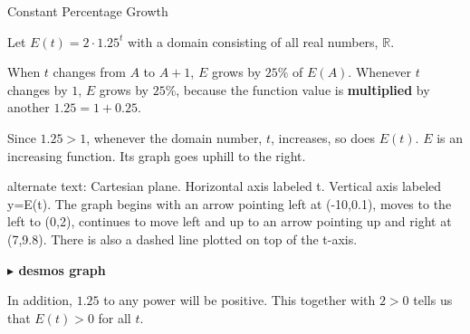 \documentclass{ximera}
\begin{document}
\begin{example} Constant Percentage Growth

Let $E(t) = 2 \cdot 1.25^t$ with a domain consisting of all real numbers, $\mathbb{R}$. 

When $t$ changes from $A$ to $A+1$, $E$ grows by $25\%$ of $E(A)$.  Whenever $t$ changes by $1$, $E$ grows by $25\%$, because the function value is \textbf{multiplied} by another $1.25 = 1 + 0.25$.


Since $1.25 > 1$, whenever the domain number, $t$, increases, so does $E(t)$.  $E$ is an increasing function.  Its graph goes uphill to the right.









\begin{image}
\end{image}

\textcolor{gray!90}{alternate text: Cartesian plane. Horizontal axis labeled t. Vertical axis labeled y=E(t).  The graph begins with an arrow pointing left at (-10,0.1), moves to the left to (0,2), continues to move left and up to an arrow pointing up and right at (7,9.8). There is also a dashed line plotted on top of the t-axis.}

\begin{onlineOnly}
\textbf{\textcolor{blue!55!black}{$\blacktriangleright$ desmos graph}} 
\begin{center}
\end{center}
\end{onlineOnly}



In addition, $1.25$ to any power will be positive.  This together with $2>0$ tells us that $E(t) > 0$ for all $t$.


\end{example}
\end{document}
